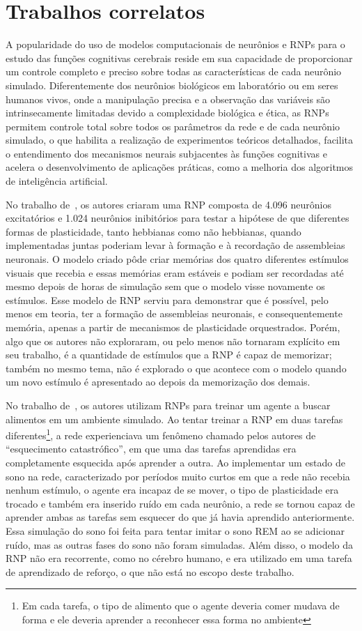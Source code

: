 \section{Trabalhos correlatos}

A popularidade do uso de modelos computacionais de neurônios e RNPs para o estudo das funções cognitivas cerebrais reside em sua
capacidade de proporcionar um controle completo e preciso sobre todas as características de cada neurônio simulado. Diferentemente
dos neurônios biológicos em laboratório ou em seres humanos vivos, onde a manipulação precisa e a observação das variáveis são
intrinsecamente limitadas devido a complexidade biológica e ética, as RNPs permitem controle total sobre todos os parâmetros da
rede e de cada neurônio simulado, o que habilita a realização de experimentos teóricos detalhados, facilita o entendimento dos
mecanismos neurais subjacentes às funções cognitivas e acelera o desenvolvimento de aplicações práticas, como a melhoria dos
algoritmos de inteligência artificial. 

No trabalho de~, os autores criaram uma RNP composta de 4.096 neurônios excitatórios e 1.024
neurônios inibitórios para testar a hipótese de que diferentes formas de plasticidade, tanto hebbianas como não hebbianas, quando
implementadas juntas poderiam levar à formação e à recordação de assembleias neuronais. O modelo criado pôde criar memórias dos
quatro diferentes estímulos visuais que recebia e essas memórias eram estáveis e podiam ser recordadas até mesmo depois de horas
de simulação sem que o modelo visse novamente os estímulos. Esse modelo de RNP serviu para demonstrar que é possível, pelo menos
em teoria, ter a formação de assembleias neuronais, e consequentemente memória, apenas a partir de mecanismos de plasticidade
orquestrados. Porém, algo que os autores não exploraram, ou pelo menos não tornaram explícito em seu trabalho, é a quantidade de
estímulos que a RNP é capaz de memorizar; também no mesmo tema, não é explorado o que acontece com o modelo quando um novo
estímulo é apresentado ao depois da memorização dos demais.

No trabalho de~, os autores utilizam RNPs para treinar um agente a buscar alimentos em um ambiente
simulado. Ao tentar treinar a RNP em duas tarefas diferentes\footnote{Em cada tarefa, o tipo de alimento que o agente deveria
comer mudava de forma e ele deveria aprender a reconhecer essa forma no ambiente}, a rede experienciava um fenômeno chamado pelos
autores de ``esquecimento catastrófico'', em que uma das tarefas aprendidas era completamente esquecida após aprender a outra. Ao
implementar um estado de sono na rede, caracterizado por períodos muito curtos em que a rede não recebia nenhum estímulo, o agente
era incapaz de se mover, o tipo de plasticidade era trocado e também era inserido ruído em cada neurônio, a rede se tornou capaz
de aprender ambas as tarefas sem esquecer do que já havia aprendido anteriormente. Essa simulação do sono foi feita para tentar
imitar o sono REM ao se adicionar ruído, mas as outras fases do sono não foram simuladas. Além disso, o modelo da RNP não era
recorrente, como no cérebro humano, e era utilizado em uma tarefa de aprendizado de reforço, o que não está no escopo deste
trabalho.

